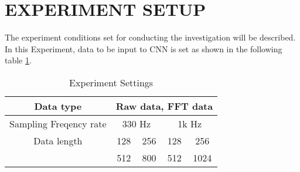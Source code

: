 \documentclass[letterpaper,  10 pt,  conference]{ieeeconf}  %
\begin{document}
%
%
%
%
%
%

\section{EXPERIMENT SETUP}

The experiment conditions set for conducting the investigation will be described. 
In this Experiment,  data to be input to CNN is set as shown in the following table \ref{sim_set}. 

\begin{table}[htb]

    \begin{center}
        \caption{Experiment Settings}
        \begin{tabular}{|c|cc|cc|}\hline
             {Data type} & \multicolumn{4}{|c|}{Raw data,   FFT data}\\
             \hline
             {Sampling Freqency rate} & \multicolumn{2}{|c|}{330 Hz} & \multicolumn{2}{c|}{1k Hz}\\
             \hline
             {Data length}&128&256&128&256\\
             {}&512&800&512&1024\\

             \hline
        \end{tabular}
    \label{sim_set}
    \end{center}

\end{table}
\end{document}
